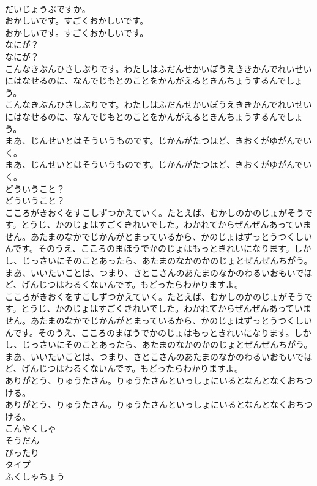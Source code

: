 \documentclass[8pt]{extreport}
\begin{document}
\begin{CJK}{UTF8}{min}
\\	だいじょうぶですか。 
\\	おかしいです。すごくおかしいです。	
\\	おかしいです。すごくおかしいです。 
\\	なにが？	
\\	なにが？ 
\\	こんなきぶんひさしぶりです。わたしはふだんせかいぼうえききかんでれいせいにはなせるのに、なんでじもとのことをかんがえるときんちょうするんでしょう。	
\\	こんなきぶんひさしぶりです。わたしはふだんせかいぼうえききかんでれいせいにはなせるのに、なんでじもとのことをかんがえるときんちょうするんでしょう。 
\\	まあ、じんせいとはそういうものです。じかんがたつほど、きおくがゆがんでいく。	
\\	まあ、じんせいとはそういうものです。じかんがたつほど、きおくがゆがんでいく。 
\\	どういうこと？	
\\	どういうこと？ 
\\	こころがきおくをすこしずつかえていく。たとえば、むかしのかのじょがそうです。とうじ、かのじょはすごくきれいでした。わかれてからぜんぜんあっていません。あたまのなかでじかんがとまっているから、かのじょはずっとうつくしいんです。そのうえ、こころのまほうでかのじょはもっときれいになります。しかし、じっさいにそのことあったら、あたまのなかのかのじょとぜんぜんちがう。まあ、いいたいことは、つまり、さとこさんのあたまのなかのわるいおもいでほど、げんじつはわるくないんです。もどったらわかりますよ。	
\\	こころがきおくをすこしずつかえていく。たとえば、むかしのかのじょがそうです。とうじ、かのじょはすごくきれいでした。わかれてからぜんぜんあっていません。あたまのなかでじかんがとまっているから、かのじょはずっとうつくしいんです。そのうえ、こころのまほうでかのじょはもっときれいになります。しかし、じっさいにそのことあったら、あたまのなかのかのじょとぜんぜんちがう。まあ、いいたいことは、つまり、さとこさんのあたまのなかのわるいおもいでほど、げんじつはわるくないんです。もどったらわかりますよ。 
\\	ありがとう、りゅうたさん。りゅうたさんといっしょにいるとなんとなくおちつける。	
\\	ありがとう、りゅうたさん。りゅうたさんといっしょにいるとなんとなくおちつける。 
\\	こんやくしゃ
\\	そうだん
\\	ぴったり
\\	タイプ
\\	ふくしゃちょう

\end{CJK}
\end{document}
